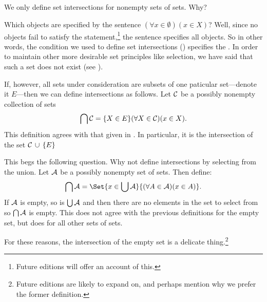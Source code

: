 

We only define set intersections for nonempty sets of sets.
Why?


Which objects are specified by the sentence $(\forall x \in \emptyset)(x \in X)$?
Well, since no objects fail to satisfy the statement,\footnote{Future editions will offer an account of this.} the sentence specifies all objects.
So in other words, the condition we used to define set intersections () specifies the .
In order to maintain other more desirable set principles like selection, we have said that such a set does not exist (see ).

If, however, all sets under consideration are subsets of one paticular set---denote it $E$---then we can define intersections as follows.
Let $\mathcal{C}$ be a possibly nonempty collection of sets
\[
  \bigcap \mathcal{C} = \{X \in E\}{(\forall X \in \mathcal{C})(x \in X)}.
\]
This definition agrees with that given in .
In particular, it is the intersection of the set $\mathcal{C} \,\cup\, \{E\}$



This begs the following question.
Why not define intersections by selecting from the union.
Let $\mathcal{A}$ be a possibly nonempty set of sets.
Then define:
\[
  \bigcap \CA = \Set{x \in \bigcup \CA}{(\forall A \in \CA)(x \in A)}.
\]
If $\mathcal{A}$ is empty, so is $\bigcup \mathcal{A}$ and then there are no elements in the set to select from so $\bigcap\mathcal{A}$ is empty.
This does not agree with the previous definitions for the empty set, but does for all other sets of sets.

For these reasons, the intersection of the empty set is a delicate thing.\footnote{Future editions are likely to expand on, and perhaps mention why we prefer the former definition.}
